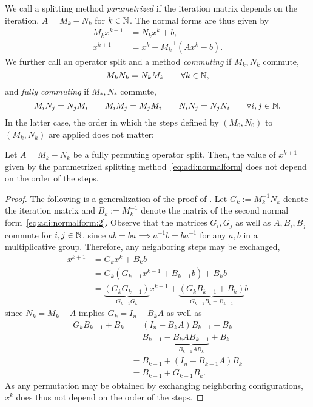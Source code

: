 We call a splitting method \emph{parametrized} if the iteration matrix depends on the iteration,
\ie $A = M_k - N_k$ for $k\in\mathbb{N}$.
The normal forms are thus given by
\begin{subequations}
\label{eq:adi:normalform}
\begin{align}
\label{eq:adi:normalform:1}
  M_k x^{k+1} &= N_k x^k + b
  ,
  \\
\label{eq:adi:normalform:2}
  x^{k+1} &= x^k - M_k^{-1} (Ax^k - b)
  .
\end{align}
\end{subequations}
We further call an operator split and a method \emph{commuting} if $M_k, N_k$ commute, \ie
\begin{equation*}
  M_k N_k = N_k M_k
  \qquad
  \forall k \in\mathbb{N},
\end{equation*}
and \emph{fully commuting} if $M_*, N_*$ commute, \ie
\begin{equation*}
  M_i N_j = N_j M_i
  \qquad
  M_i M_j = M_j M_i
  \qquad
  N_i N_j = N_j N_i
  \qquad
  \forall i,j \in\mathbb{N}
  .
\end{equation*}
In the latter case,
the order in which the steps defined by $(M_0,N_0)$ to $(M_k,N_k)$ are applied does not matter:

\begin{proposition}
\label{thm:adi:permutation}
  Let $A = M_k - N_k$ be a fully permuting operator split.
  Then, the value of $x^{k+1}$ given by the parametrized splitting method~\eqref{eq:adi:normalform}
  does not depend on the order of the steps.
\end{proposition}
\begin{proof}
  The following is a generalization of the proof of \cite[Theorem~4.1]{Li2002}.
  Let $G_k := M_k^{-1} N_k$ denote the iteration matrix
  and $B_k := M_k^{-1}$ denote the matrix of the second normal form~\eqref{eq:adi:normalform:2}.
  Observe that the matrices $G_i, G_j$ as well as $A, B_i, B_j$ commute for $i,j\in\mathbb{N}$,
  since $ab=ba \implies a^{-1}b = ba^{-1}$ for any $a,b$ in a multiplicative group.
  Therefore, any neighboring steps may be exchanged,
  \begin{align*}
    x^{k+1}
    &= G_k x^k + B_k b \\
    &= G_k (G_{k-1} x^{k-1} + B_{k-1} b) + B_k b \\
    &= \underbrace{
      (G_k G_{k-1})
    }_{
      G_{k-1} G_k
    } x^{k-1} + \underbrace{
      (G_k B_{k-1} + B_k)
    }_{
      G_{k-1} B_k + B_{k-1}
    } b
  \end{align*}
  since $N_k = M_k - A$ implies $G_k = I_n - B_k A$ as well as
  \begin{align*}
    G_k B_{k-1} + B_k
    &= (I_n - B_k A) B_{k-1} + B_k \\
    &= B_{k-1} - \underbrace{
      B_k A B_{k-1}
    }_{
      B_{k-1} A B_k
    } + B_k \\
    &= B_{k-1} + (I_n - B_{k-1} A) B_k \\
    &= B_{k-1} + G_{k-1} B_k
    .
  \end{align*}
  As any permutation may be obtained by exchanging neighboring configurations,
  $x^k$ does thus not depend on the order of the steps.
\end{proof}

